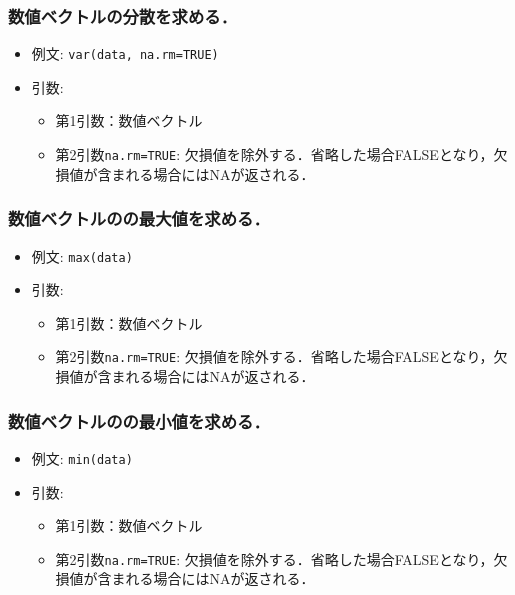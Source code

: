 \documentclass[
  xelatex, ja=standard]{bxjsarticle}
\providecommand{\tightlist}{%
  \setlength{\itemsep}{0pt}\setlength{\parskip}{0pt}}
\begin{document}
\subsubsection{数値ベクトルの分散を求める．}\label{ux6570ux5024ux30d9ux30afux30c8ux30ebux306eux5206ux6563ux3092ux6c42ux3081ux308b}

\begin{itemize}
\tightlist
\item
  例文: \texttt{var(data,\ na.rm=TRUE)}
\item
  引数:

  \begin{itemize}
  \tightlist
  \item
    第1引数：数値ベクトル
  \item
    第2引数\texttt{na.rm=TRUE}:
    欠損値を除外する．省略した場合FALSEとなり，欠損値が含まれる場合にはNAが返される．
  \end{itemize}
\end{itemize}

\subsubsection{数値ベクトルのの最大値を求める．}\label{ux6570ux5024ux30d9ux30afux30c8ux30ebux306eux306eux6700ux5927ux5024ux3092ux6c42ux3081ux308b}

\begin{itemize}
\tightlist
\item
  例文: \texttt{max(data)}
\item
  引数:

  \begin{itemize}
  \tightlist
  \item
    第1引数：数値ベクトル
  \item
    第2引数\texttt{na.rm=TRUE}:
    欠損値を除外する．省略した場合FALSEとなり，欠損値が含まれる場合にはNAが返される．
  \end{itemize}
\end{itemize}

\subsubsection{数値ベクトルのの最小値を求める．}\label{ux6570ux5024ux30d9ux30afux30c8ux30ebux306eux306eux6700ux5c0fux5024ux3092ux6c42ux3081ux308b}

\begin{itemize}
\tightlist
\item
  例文: \texttt{min(data)}
\item
  引数:

  \begin{itemize}
  \tightlist
  \item
    第1引数：数値ベクトル
  \item
    第2引数\texttt{na.rm=TRUE}:
    欠損値を除外する．省略した場合FALSEとなり，欠損値が含まれる場合にはNAが返される．
  \end{itemize}
\end{itemize}
\end{document}
